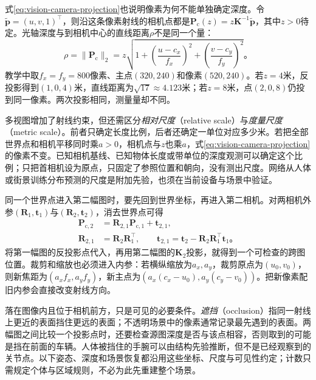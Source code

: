 式\eqref{eq:vision-camera-projection}也说明像素为何不能单独确定深度。令$\tilde{\bm{p}}=(u,v,1)^\top$，则沿这条像素射线的相机点都是$\bm{P}_{\mathrm c}(z)=z\bm{K}^{-1}\tilde{\bm{p}}$，其中$z>0$待定。光轴深度与到相机中心的直线距离$\rho$不是同一个量：
\begin{equation}
 \rho=\lVert\bm{P}_{\mathrm c}\rVert_2
 =z\sqrt{1+\left(\frac{u-c_x}{f_x}\right)^2
            +\left(\frac{v-c_y}{f_y}\right)^2}\text{。}
 \label{eq:vision-depth-range-measurement}
\end{equation}
教学中取$f_x=f_y=800$像素、主点$(320,240)$和像素$(520,240)$。若$z=4$米，反投影得到$(1,0,4)$米，直线距离为$\sqrt{17}\approx4.123$米；若$z=8$米，点$(2,0,8)$仍投到同一像素。两次投影相同，测量量却不同。

多视图增加了射线约束，但还需区分\emph{相对尺度}（relative scale）与\emph{度量尺度}（metric scale）。前者只确定长度比例，后者还确定一单位对应多少米。若把全部世界点和相机平移同时乘$a>0$，相机点与$z$也乘$a$，式\eqref{eq:vision-camera-projection}的像素不变。已知相机基线、已知物体长度或带单位的深度观测可以确定这个比例；只把首相机设为原点，只固定了参照位置和朝向，没有测出尺度。网络从人体或街景训练分布预测的尺度是附加先验，也须在当前设备与场景中验证。

同一个世界点进入第二幅图时，要先回到世界坐标，再进入第二相机。对两相机外参$(\bm{R}_1,\bm{t}_1)$与$(\bm{R}_2,\bm{t}_2)$，消去世界点可得
\begin{equation}
 \begin{aligned}
 \bm{P}_{\mathrm c,2}
 &=\bm{R}_{2,1}\bm{P}_{\mathrm c,1}+\bm{t}_{2,1},\\
 \bm{R}_{2,1}&=\bm{R}_2\bm{R}_1^\top,\qquad
 \bm{t}_{2,1}=\bm{t}_2-\bm{R}_2\bm{R}_1^\top\bm{t}_1\text{。}
 \end{aligned}
 \label{eq:vision-relative-camera-measurement}
\end{equation}
将第一幅图的反投影点代入，再用第二幅图的$\bm{K}_2$投影，就得到一个可检查的跨图位置。裁剪和缩放也必须进入内参：若横纵缩放为$a_x,a_y$，裁剪原点为$(u_0,v_0)$，则新焦距为$(a_xf_x,a_yf_y)$，新主点为$(a_x(c_x-u_0),a_y(c_y-v_0))$。把新像素配旧内参会直接改变射线方向。

落在图像内且位于相机前方，只是可见的必要条件。\emph{遮挡}（occlusion）指同一射线上更近的表面挡住更远的表面；不透明场景中的像素通常记录最先遇到的表面。两幅图之间比较一个投影点时，还要检查源图深度是否与该点相容，否则取到的可能是挡在前面的车辆。人体被挡住的手腕可以由结构先验推断，但不是已经观察到的关节点。以下姿态、深度和场景恢复都沿用这些坐标、尺度与可见性约定；计数只需规定个体与区域规则，不必为此先重建整个场景。

